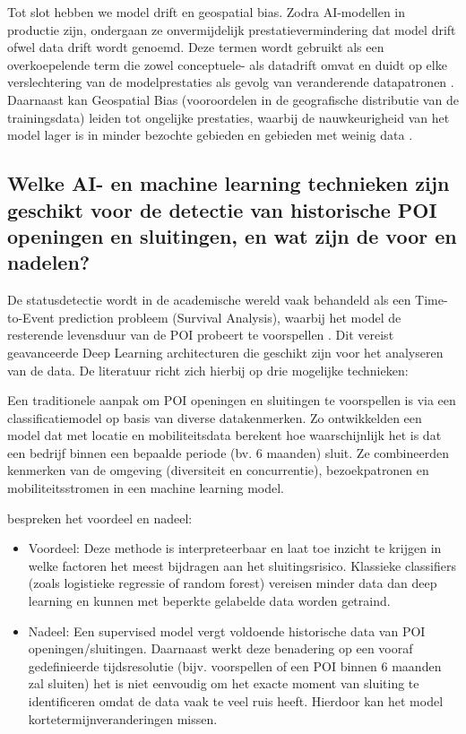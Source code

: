Tot slot hebben we model drift en geospatial bias. Zodra AI-modellen in productie zijn, ondergaan ze onvermijdelijk prestatievermindering dat model drift ofwel data drift wordt genoemd. Deze termen wordt gebruikt als een overkoepelende term die zowel conceptuele- als datadrift omvat en duidt op elke verslechtering van de modelprestaties als gevolg van veranderende datapatronen \autocite{Iyer2025}. Daarnaast kan Geospatial Bias (vooroordelen in de geografische distributie van de trainingsdata) leiden tot ongelijke prestaties, waarbij de nauwkeurigheid van het model lager is in minder bezochte gebieden en gebieden met weinig data \autocite{Raza2025}.

\subsection{Welke AI- en machine learning technieken zijn geschikt voor de detectie van historische POI openingen en sluitingen, en wat zijn de voor en nadelen?}

De statusdetectie wordt in de academische wereld vaak behandeld als een Time-to-Event prediction probleem (Survival Analysis), waarbij het model de resterende levensduur van de POI probeert te voorspellen \autocite{Chen2024}. Dit vereist geavanceerde Deep Learning architecturen die geschikt zijn voor het analyseren van de data. De literatuur richt zich hierbij op drie mogelijke technieken:

Een traditionele aanpak om POI openingen en sluitingen te voorspellen is via een classificatiemodel op basis van diverse datakenmerken. Zo ontwikkelden \textcite{DSilva2018} een model dat met locatie en mobiliteitsdata berekent hoe waarschijnlijk het is dat een bedrijf binnen een bepaalde periode (bv. 6 maanden) sluit. Ze combineerden kenmerken van de omgeving (diversiteit en concurrentie), bezoekpatronen en mobiliteitsstromen in een machine learning model. 

\textcite{DSilva2018} bespreken het voordeel en nadeel:
\begin{itemize}
    \item Voordeel: Deze methode is interpreteerbaar en laat toe inzicht te krijgen in welke factoren het meest bijdragen aan het sluitingsrisico. Klassieke classifiers (zoals logistieke regressie of random forest) vereisen minder data dan deep learning en kunnen met beperkte gelabelde data worden getraind.
    \item Nadeel: Een supervised model vergt voldoende historische data van POI openingen/sluitingen. Daarnaast werkt deze benadering op een vooraf gedefinieerde tijdsresolutie (bijv. voorspellen of een POI binnen 6 maanden zal sluiten) het is niet eenvoudig om het exacte moment van sluiting te identificeren omdat de data vaak te veel ruis heeft. Hierdoor kan het model kortetermijnveranderingen missen. 
\end{itemize}

